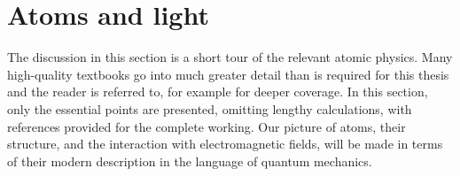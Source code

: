 	

\section{Atoms and light}
\label{sec:atoms_and_light}
	The discussion in this section is a short tour of the relevant atomic physics.
	Many high-quality textbooks go into much greater detail than is required for this thesis and the reader is referred to, for example \cite{FootAtomic,BinneyBook} for deeper coverage.
	In this section, only the essential points are presented, omitting lengthy calculations, with references provided for the complete working.
	Our picture of atoms, their structure, and the interaction with electromagnetic fields, will be made in terms of their modern description in the language of quantum mechanics.

